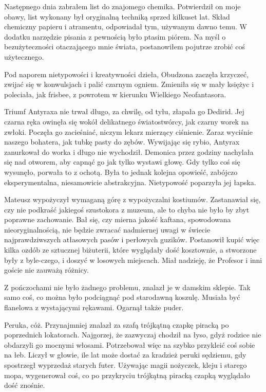 Następnego dnia zabrałem list do znajomego chemika.
Potwierdził on moje obawy, list wykonany był oryginalną techniką sprzed kilkuset lat.
Skład chemiczny papieru i atramentu, odpowiadał tym, używanym dawno temu.
W dodatku narzędzie pisania z pewnością było ptasim piórem.
Na myśl o bezużyteczności otaczającego mnie świata, postanowiłem pojutrze zrobić coś użytecznego.

\divider{}

Pod naporem nietypowości i kreatywności dzieła, Obudzona zaczęła krzyczeć, zwijać się w konwulsjach i palić czarnym ogniem.
Zmieniła się w mały księżyc i poleciała, jak frisbee, z powrotem w kierunku Wielkiego Neofantasora.

Triumf Antyraxa nie trwał długo, za chwilę, od tyłu, złapała go Dedirid.
Jej czarna ręka owinęła się wokół delikatnego światostwórcy, jak czarny worek na zwłoki.
Poczęła go zacieśniać, niczym lekarz mierzący ciśnienie.
Zaraz wyciśnie naszego bohatera, jak tubkę pasty do zębów.
Wywijając się rybio, Antyrax zanurkował do worka i długo nie wychodził.
Demonica przez godziny nachylała się nad otworem, aby capnąć go jak tylko wystawi głowę.
Gdy tylko coś się wysunęło, porwała to z ochotą.
Była to jednak kolejna opowieść, zabójczo eksperymentalna, niesamowicie abstrakcyjna.
Nietypowość poparzyła jej łapska.

\divider{}

Mateusz wypożyczył wymaganą górę z wypożyczalni kostiumów.
Zastanawiał się, czy nie podkraść jakiegoś szustokora z muzeum, ale to chyba nie było by zbyt poprawne zachowanie.
Bał się, czy mierna jakość kaftana, spowodowana nieoryginalnością, nie będzie zwracać nadmiernej uwagi w świecie najprawdziwszych atłasowych pasów i perłowych guzików.
Postanowił kupić więc kilka ozdób ze sztucznej biżuterii, które wyglądały dość kosztownie, a stworzone były z
byle-czego, i doszyć w losowych miejscach. Miał nadzieję, że Profesor i inni goście nie zauważą różnicy.

Z pończochami nie było żadnego problemu, znalazł je w damskim sklepie.
Tak samo coś, co można było podciągnąć pod starodawną koszulę.
Musiała być flanelowa z wystającymi rękawami.
Ogarnął także puder.

Peruka, cóż. Przynajmniej znalazł za szafą trójkątną czapkę piracką po poprzednich lokatorach.
Najgorzej, że zazwyczaj chodził na łyso, gdyż rodzice nie obdarzyli go mocnymi włosami.
Potrzebował więc na szybko przykleić coś sobie na łeb.
Liczył w głowie, ile lat może dostać za kradzież peruki sędziemu, gdy spostrzegł wyprzedaż starych futer.
Używając magii nożyczek, kleju i starego mopa, wygenerował coś, co po przykryciu trójkątną piracką czapką wyglądało dość znośnie.

